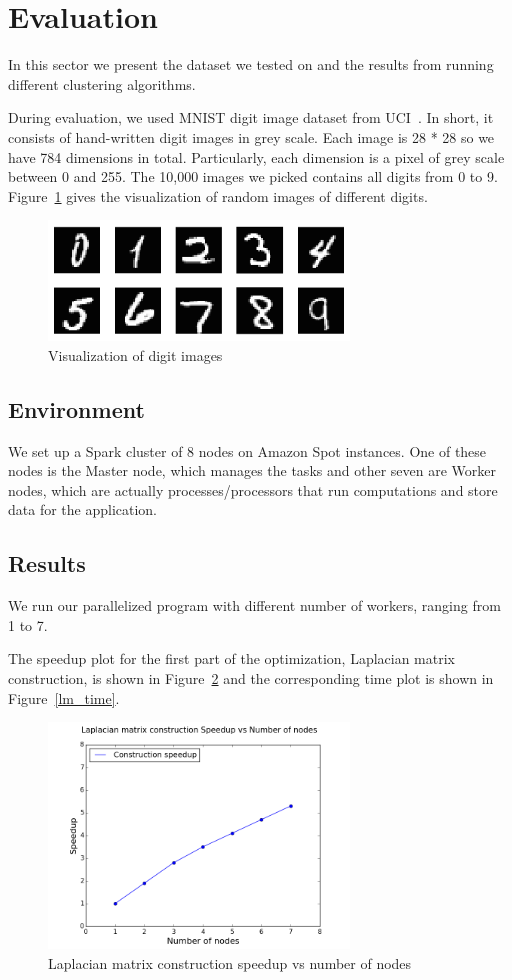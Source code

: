 \documentclass{acm_proc_article-sp}
\begin{document}
\section{Evaluation}
In this sector we present the dataset we tested on and the results from running different clustering algorithms.

During evaluation, we used MNIST digit image dataset from UCI~\cite{Lichman:2013}. In short, it consists of hand-written digit images in grey scale. Each image is 28 * 28 so we have 784 dimensions in total. Particularly, each dimension is a pixel of grey scale between 0 and 255. The 10,000 images we picked contains all digits from 0 to 9. Figure~\ref{visual_digits} gives the visualization of random images of different digits.

\begin{figure}[h]
\centering
\includegraphics[height=3.2cm]{digits.png}
\caption{Visualization of digit images}
\label{visual_digits}
\end{figure}

\subsection{Environment}
We set up a Spark cluster of 8 nodes on Amazon Spot instances. One of these nodes is the Master node, which manages the tasks and other seven are Worker nodes, which are actually processes/processors that run computations and store data for the application.

\subsection{Results}
We run our parallelized program with different number of workers, ranging from 1 to 7.

The speedup plot for the first part of the optimization, Laplacian matrix construction, is shown in Figure~\ref{lm_speedup} and the corresponding time plot is shown in Figure~\ref{lm_time}.
\begin{figure}[ht]
\centering
\includegraphics[height=6cm]{ms.png}
\caption{Laplacian matrix construction speedup vs number of nodes}
\label{lm_speedup}
\end{figure}
\end{document}
